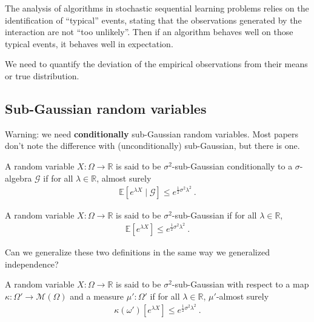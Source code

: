 
The analysis of algorithms in stochastic sequential learning problems relies on the identification of ``typical'' events, stating that the observations generated by the interaction are not ``too unlikely''. Then if an algorithm behaves well on those typical events, it behaves well in expectation.

We need to quantify the deviation of the empirical observations from their means or true distribution.

\subsection{Sub-Gaussian random variables}
\label{sub:sub_gaussian_random_variables}

Warning: we need \textbf{conditionally} sub-Gaussian random variables. Most papers don't note the difference with (unconditionally) sub-Gaussian, but there is one.

\begin{definition}
A random variable $X : \Omega \to \mathbb{R}$ is said to be $\sigma^2$-sub-Gaussian conditionally to a $\sigma$-algebra $\mathcal G$ if for all $\lambda \in \mathbb{R}$, almost surely
\begin{align*}
\mathbb{E}[e^{\lambda X} \mid \mathcal G] \le e^{\frac{1}{2}\sigma^2\lambda^2} \: .
\end{align*}

A random variable $X : \Omega \to \mathbb{R}$ is said to be $\sigma^2$-sub-Gaussian if for all $\lambda \in \mathbb{R}$,
\begin{align*}
\mathbb{E}[e^{\lambda X}] \le e^{\frac{1}{2}\sigma^2\lambda^2} \: .
\end{align*}
\end{definition}

Can we generalize these two definitions in the same way we generalized independence?

\begin{definition}
A random variable $X : \Omega \to \mathbb{R}$ is said to be $\sigma^2$-sub-Gaussian with respect to a map $\kappa : \Omega' \to \mathcal M(\Omega)$ and a measure $\mu' : \Omega'$ if for all $\lambda \in \mathbb{R}$, $\mu'$-almost surely
\begin{align*}
\kappa(\omega')[e^{\lambda X}] \le e^{\frac{1}{2}\sigma^2\lambda^2} \: .
\end{align*}
\end{definition}

